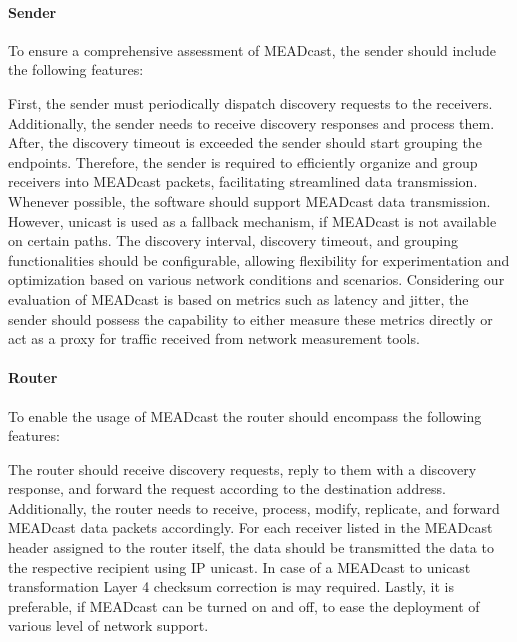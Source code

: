 \paragraph{Sender} %
\label{par:Sender}
To ensure a comprehensive assessment of MEADcast, the sender should include the
    following features:

First, the sender must periodically dispatch discovery requests to the
    receivers.
Additionally, the sender needs to receive discovery responses and process them.
After, the discovery timeout is exceeded the sender should start grouping the
    endpoints.
Therefore, the sender is required to efficiently organize and group receivers
    into MEADcast packets, facilitating streamlined data transmission.
Whenever possible, the software should support MEADcast data transmission.
However, unicast is used as a fallback mechanism, if MEADcast is not available
    on certain paths.
The discovery interval, discovery timeout, and grouping functionalities should
    be configurable, allowing flexibility for experimentation and optimization
    based on various network conditions and scenarios.
Considering our evaluation of MEADcast is based on metrics such as latency and
    jitter, the sender should possess the capability to either measure these
    metrics directly or act as a proxy for traffic received from network
    measurement tools.

\paragraph{Router} %
\label{par:Router}
To enable the usage of MEADcast the router should encompass the following
    features:

The router should receive discovery requests, reply to them with a discovery
    response, and forward the request according to the destination address.
Additionally, the router needs to receive, process, modify, replicate, and
    forward MEADcast data packets accordingly.
For each receiver listed in the MEADcast header assigned to the router itself,
    the data should be transmitted the data to the respective recipient using
    IP unicast.
In case of a MEADcast to unicast transformation Layer 4 checksum correction is
    may required.
Lastly, it is preferable, if MEADcast can be turned on and off, to ease the
    deployment of various level of network support.

